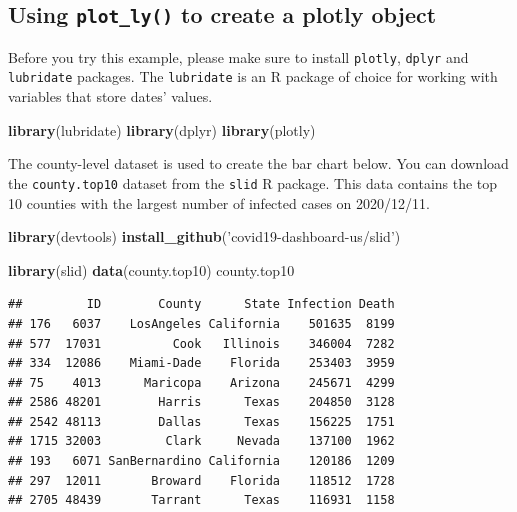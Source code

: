 \documentclass[]{book}
\newenvironment{Shaded}{\begin{snugshade}}{\end{snugshade}}
\newcommand{\KeywordTok}[1]{\textcolor[rgb]{0.13,0.29,0.53}{\textbf{#1}}}
\newcommand{\StringTok}[1]{\textcolor[rgb]{0.31,0.60,0.02}{#1}}
\newcommand{\NormalTok}[1]{#1}
\begin{document}
\subsection{\texorpdfstring{Using \texttt{plot\_ly()} to create a plotly
object}{Using plot\_ly() to create a plotly object}}\label{using-plot_ly-to-create-a-plotly-object}

Before you try this example, please make sure to install
\texttt{plotly}, \texttt{dplyr} and \texttt{lubridate} packages. The
\texttt{lubridate} is an R package of choice for working with variables
that store dates' values.

\begin{Shaded}
\begin{Highlighting}[]
\KeywordTok{library}\NormalTok{(lubridate)}
\KeywordTok{library}\NormalTok{(dplyr)}
\KeywordTok{library}\NormalTok{(plotly)}
\end{Highlighting}
\end{Shaded}

The county-level dataset is used to create the bar chart below. You can
download the \texttt{county.top10} dataset from the \texttt{slid} R
package. This data contains the top 10 counties with the largest number
of infected cases on 2020/12/11.

\begin{Shaded}
\begin{Highlighting}[]
\KeywordTok{library}\NormalTok{(devtools)}
\KeywordTok{install_github}\NormalTok{(}\StringTok{'covid19-dashboard-us/slid'}\NormalTok{)}
\end{Highlighting}
\end{Shaded}

\begin{Shaded}
\begin{Highlighting}[]
\KeywordTok{library}\NormalTok{(slid)}
\KeywordTok{data}\NormalTok{(county.top10)}
\NormalTok{county.top10}
\end{Highlighting}
\end{Shaded}

\begin{verbatim}
##         ID        County      State Infection Death
## 176   6037    LosAngeles California    501635  8199
## 577  17031          Cook   Illinois    346004  7282
## 334  12086    Miami-Dade    Florida    253403  3959
## 75    4013      Maricopa    Arizona    245671  4299
## 2586 48201        Harris      Texas    204850  3128
## 2542 48113        Dallas      Texas    156225  1751
## 1715 32003         Clark     Nevada    137100  1962
## 193   6071 SanBernardino California    120186  1209
## 297  12011       Broward    Florida    118512  1728
## 2705 48439       Tarrant      Texas    116931  1158
\end{verbatim}
\end{document}
